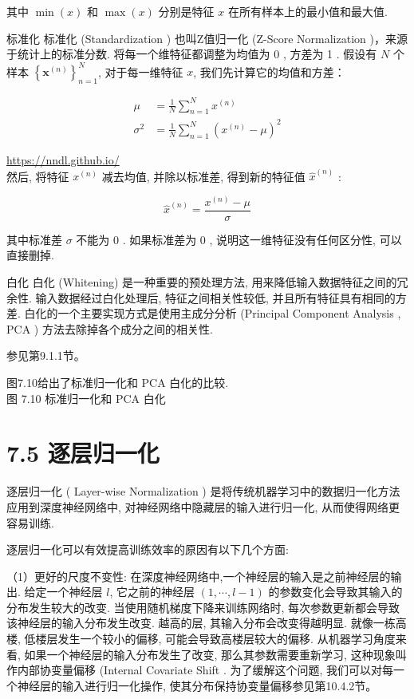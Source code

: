 \documentclass[10pt]{article}
\begin{document}
其中 $\min (x)$ 和 $\max (x)$ 分别是特征 $x$ 在所有样本上的最小值和最大值.

标准化 标准化 (Standardization ) 也叫Z值归一化 (Z-Score Normalization )，来源于统计上的标准分数. 将每一个维特征都调整为均值为 0 , 方差为 1 . 假设有 $N$ 个样本 $\left\{\boldsymbol{x}^{(n)}\right\}_{n=1}^{N}$, 对于每一维特征 $x$, 我们先计算它的均值和方差：


\begin{align*}
\mu & =\frac{1}{N} \sum_{n=1}^{N} x^{(n)}  \tag{7.48}\\
\sigma^{2} & =\frac{1}{N} \sum_{n=1}^{N}\left(x^{(n)}-\mu\right)^{2} \tag{7.49}
\end{align*}


\href{https://nndl.github.io/}{https://nndl.github.io/}\\
然后, 将特征 $x^{(n)}$ 减去均值, 并除以标准差, 得到新的特征值 $\hat{x}^{(n)}$ :


\begin{equation*}
\hat{x}^{(n)}=\frac{x^{(n)}-\mu}{\sigma} \tag{7.50}
\end{equation*}


其中标准差 $\sigma$ 不能为 0 . 如果标准差为 0 , 说明这一维特征没有任何区分性, 可以直接删掉.

白化 白化 (Whitening) 是一种重要的预处理方法, 用来降低输入数据特征之间的冗余性. 输入数据经过白化处理后, 特征之间相关性较低, 并且所有特征具有相同的方差. 白化的一个主要实现方式是使用主成分分析 (Principal Component Analysis , PCA ) 方法去除掉各个成分之间的相关性.

参见第9.1.1节。

图7.10给出了标准归一化和 PCA 白化的比较.\\


图 7.10 标准归一化和 PCA 白化

\section*{7.5 逐层归一化}
逐层归一化 ( Layer-wise Normalization ) 是将传统机器学习中的数据归一化方法应用到深度神经网络中, 对神经网络中隐藏层的输入进行归一化, 从而使得网络更容易训练.

逐层归一化可以有效提高训练效率的原因有以下几个方面:

（1）更好的尺度不变性: 在深度神经网络中,一个神经层的输入是之前神经层的输出. 给定一个神经层 $l$, 它之前的神经层 $(1, \cdots, l-1)$ 的参数变化会导致其输入的分布发生较大的改变. 当使用随机梯度下降来训练网络时, 每次参数更新都会导致该神经层的输入分布发生改变. 越高的层, 其输入分布会改变得越明显. 就像一栋高楼, 低楼层发生一个较小的偏移, 可能会导致高楼层较大的偏移. 从机器学习角度来看, 如果一个神经层的输入分布发生了改变, 那么其参数需要重新学习, 这种现象叫作内部协变量偏移 (Internal Covariate Shift . 为了缓解这个问题, 我们可以对每一个神经层的输入进行归一化操作, 使其分布保持协变量偏移参见第10.4.2节。
\end{document}
